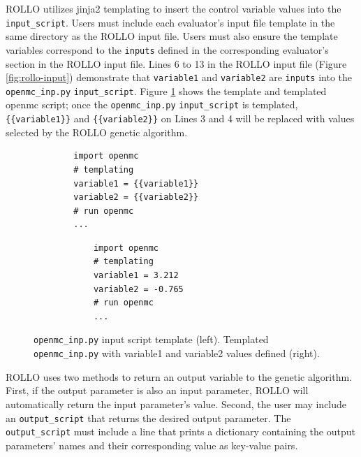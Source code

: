 \gls{ROLLO} utilizes jinja2 templating \cite{ronacher_welcome_2018} to insert 
the control variable values into the \texttt{input\_script}.
Users must include each evaluator's input file template in the same directory as the \gls{ROLLO} input 
file. 
Users must also ensure the template variables correspond to the \texttt{inputs} defined in the 
corresponding evaluator's section in the ROLLO input file. 
Lines 6 to 13 in the \gls{ROLLO} input file (Figure \ref{fig:rollo-input}) demonstrate 
that \texttt{variable1} and \texttt{variable2} are \texttt{inputs} into the 
\texttt{openmc\_inp.py} \texttt{input\_script}. 
Figure \ref{fig:openmcinp.py} shows the template and templated openmc script; 
once the \texttt{openmc\_inp.py} \texttt{input\_script} is templated, 
\texttt{\{\{variable1\}\}} and \texttt{\{\{variable2\}\}}  on Lines 3 and 4 will be 
replaced with values selected by the \gls{ROLLO} genetic algorithm. 
\begin{figure}[]
    \begin{minipage}{0.4\textwidth}
        \centering
    \begin{verbatim}
        import openmc 
        # templating 
        variable1 = {{variable1}}
        variable2 = {{variable2}}
        # run openmc 
        ... 
    \end{verbatim}
    \end{minipage}
    \hspace{2cm}
    \begin{minipage}{0.4\textwidth}
        \centering
        \begin{verbatim}
            import openmc 
            # templating 
            variable1 = 3.212
            variable2 = -0.765
            # run openmc 
            ... 
        \end{verbatim}
        \end{minipage}
    \caption{\texttt{openmc\_inp.py} input script template (left). 
             Templated \texttt{openmc\_inp.py} with variable1 and variable2 
             values defined (right).}
    \label{fig:openmcinp.py}
\end{figure}

\gls{ROLLO} uses two methods to return an output variable to the genetic algorithm. 
First, if the output parameter is also an input parameter, \gls{ROLLO} will automatically 
return the input parameter's value. 
Second, the user may include an \texttt{output\_script} that returns the desired 
output parameter. 
The \texttt{output\_script} must include a line that prints a dictionary containing 
the output parameters' names and their corresponding value as key-value pairs. 


